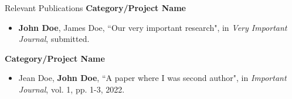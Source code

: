 \documentclass[10pt]{resume} %
\begin{document}
\vspace*{-2mm}
\begin{rSection}{Relevant Publications\hspace*{65mm} }
	{\bf Category/Project Name}
	\begin{itemize}
		\item \textbf{John Doe}, James Doe, ``Our very important research", in \textit{Very Important Journal}, submitted.
	\end{itemize}
	{\bf Category/Project Name}
	\begin{itemize}
		\item Jean Doe, \textbf{John Doe}, ``A paper where I was second author", in \textit{Important Journal}, vol. 1, pp. 1-3, 2022.
	\end{itemize}
\end{rSection}
\end{document}
